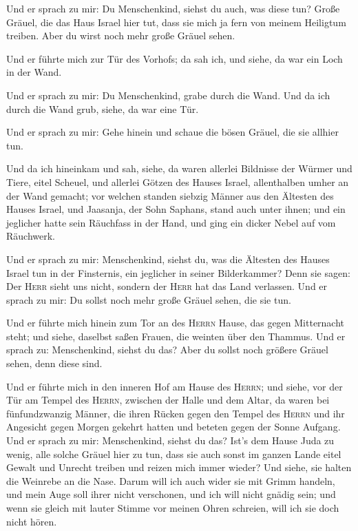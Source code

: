  Und er sprach zu mir: Du Menschenkind, siehst du auch,
was diese tun? Große Gräuel, die das Haus Israel hier tut, dass sie mich
ja fern von meinem Heiligtum treiben. Aber du wirst noch mehr große
Gräuel sehen.

 Und er führte mich zur Tür des Vorhofs; da sah ich, und
siehe, da war ein Loch in der Wand.

 Und er sprach zu mir: Du Menschenkind, grabe durch die
Wand. Und da ich durch die Wand grub, siehe, da war eine Tür.

 Und er sprach zu mir: Gehe hinein und schaue die bösen
Gräuel, die sie allhier tun.

 Und da ich hineinkam und sah, siehe, da waren allerlei
Bildnisse der Würmer und Tiere, eitel Scheuel, und allerlei Götzen des
Hauses Israel, allenthalben umher an der Wand gemacht; 
vor welchen standen siebzig Männer aus den Ältesten des Hauses Israel,
und Jaasanja, der Sohn Saphans, stand auch unter ihnen; und ein
jeglicher hatte sein Räuchfass in der Hand, und ging ein dicker Nebel
auf vom Räuchwerk.

 Und er sprach zu mir: Menschenkind, siehst du, was die
Ältesten des Hauses Israel tun in der Finsternis, ein jeglicher in
seiner Bilderkammer? Denn sie sagen: Der \textsc{Herr} sieht uns nicht,
sondern der \textsc{Herr} hat das Land verlassen.  Und er
sprach zu mir: Du sollst noch mehr große Gräuel sehen, die sie tun.

 Und er führte mich hinein zum Tor an des \textsc{Herrn}
Hause, das gegen Mitternacht steht; und siehe, daselbst saßen Frauen,
die weinten über den Thammus.  Und er sprach zu:
Menschenkind, siehst du das? Aber du sollst noch größere Gräuel sehen,
denn diese sind.

 Und er führte mich in den inneren Hof am Hause des
\textsc{Herrn}; und siehe, vor der Tür am Tempel des \textsc{Herrn},
zwischen der Halle und dem Altar, da waren bei fünfundzwanzig Männer,
die ihren Rücken gegen den Tempel des \textsc{Herrn} und ihr Angesicht
gegen Morgen gekehrt hatten und beteten gegen der Sonne Aufgang.
 Und er sprach zu mir: Menschenkind, siehst du das? Ist's
dem Hause Juda zu wenig, alle solche Gräuel hier zu tun, dass sie auch
sonst im ganzen Lande eitel Gewalt und Unrecht treiben und reizen mich
immer wieder? Und siehe, sie halten die Weinrebe an die Nase.
 Darum will ich auch wider sie mit Grimm handeln, und
mein Auge soll ihrer nicht verschonen, und ich will nicht gnädig sein;
und wenn sie gleich mit lauter Stimme vor meinen Ohren schreien, will
ich sie doch nicht hören.

